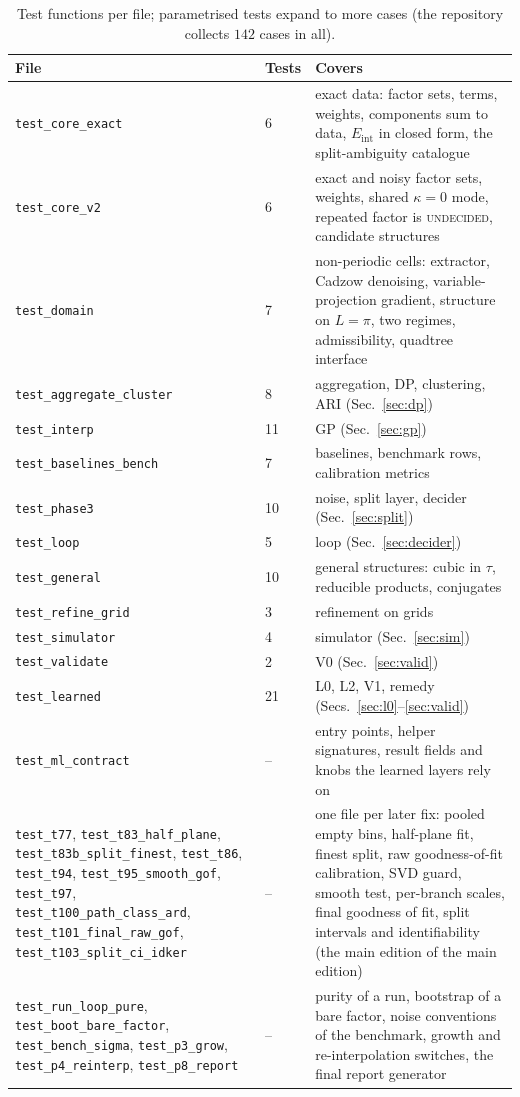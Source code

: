 \documentclass[11pt]{article}
\theoremstyle{plain}
\theoremstyle{definition}
\theoremstyle{remark}
\newcommand{\Eint}{E_{\mathrm{int}}}        %
\begin{document}
\begin{table}[!htb]
\centering\small
\begin{tabular}{@{}L{4.4cm}L{1.2cm}L{6.6cm}@{}}
\toprule
File & Tests & Covers\\\midrule
\texttt{test\_core\_exact} & 6 & exact data: factor sets, terms, weights, components sum to data, $\Eint$ in closed form, the split-ambiguity catalogue\\
\texttt{test\_core\_v2} & 6 & exact and noisy factor sets, weights, shared $\kappa=0$ mode, repeated factor is \textsc{undecided}, candidate structures\\
\texttt{test\_domain} & 7 & non-periodic cells: extractor, Cadzow denoising, variable-projection gradient, structure on $L=\pi$, two regimes, admissibility, quadtree interface\\
\texttt{test\_aggregate\_cluster} & 8 & aggregation, DP, clustering, ARI (Sec.~\ref{sec:dp})\\
\texttt{test\_interp} & 11 & GP (Sec.~\ref{sec:gp})\\
\texttt{test\_baselines\_bench} & 7 & baselines, benchmark rows, calibration metrics\\
\texttt{test\_phase3} & 10 & noise, split layer, decider (Sec.~\ref{sec:split})\\
\texttt{test\_loop} & 5 & loop (Sec.~\ref{sec:decider})\\
\texttt{test\_general} & 10 & general structures: cubic in $\tau$, reducible products, conjugates\\
\texttt{test\_refine\_grid} & 3 & refinement on grids\\
\texttt{test\_simulator} & 4 & simulator (Sec.~\ref{sec:sim})\\
\texttt{test\_validate} & 2 & V0 (Sec.~\ref{sec:valid})\\
\texttt{test\_learned} & 21 & L0, L2, V1, remedy (Secs.~\ref{sec:l0}--\ref{sec:valid})\\
\texttt{test\_ml\_contract} & -- & entry points, helper signatures, result fields and knobs the learned layers rely on\\
\texttt{test\_t77}, \texttt{test\_t83\_half\_plane}, \texttt{test\_t83b\_split\_finest}, \texttt{test\_t86}, \texttt{test\_t94}, \texttt{test\_t95\_smooth\_gof}, \texttt{test\_t97}, \texttt{test\_t100\_path\_class\_ard}, \texttt{test\_t101\_final\_raw\_gof}, \texttt{test\_t103\_split\_ci\_idker} & -- & one file per later fix: pooled empty bins, half-plane fit, finest split, raw goodness-of-fit calibration, SVD guard, smooth test, per-branch scales, final goodness of fit, split intervals and identifiability (the main edition of the main edition)\\
\texttt{test\_run\_loop\_pure}, \texttt{test\_boot\_bare\_factor}, \texttt{test\_bench\_sigma}, \texttt{test\_p3\_grow}, \texttt{test\_p4\_reinterp}, \texttt{test\_p8\_report} & -- & purity of a run, bootstrap of a bare factor, noise conventions of the benchmark, growth and re-interpolation switches, the final report generator\\
\bottomrule
\end{tabular}
\caption{Test functions per file; parametrised tests expand to more cases (the repository collects $142$ cases in all).}
\end{table}
\end{document}
